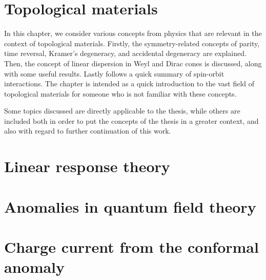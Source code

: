 \documentclass[
draft,
fontsize=11pt,
paper=B5,
BCOR=5mm,
]{scrbook}
\begin{document}
% 
\frontmatter
{}


\tableofcontents

\mainmatter
{}


\chapter{Topological materials}
In this chapter, we consider various concepts from physics that are relevant in the context of topological materials.
Firstly, the symmetry-related concepts of parity, time reversal, Kramer's degeneracy, and accidental degeneracy are explained.
Then, the concept of linear dispersion in Weyl and Dirac cones is discussed, along with some useful results.
Lastly follows a quick summary of spin-orbit interactions.
The chapter is intended as a quick introduction to the vast field of topological materials for someone who is not familiar with these concepts.

Some topics discussed are directly applicable to the thesis, while others are included both in order to put the concepts of the thesis in a greater context, and also with regard to further continuation of this work.









\chapter{Linear response theory}


\chapter{Anomalies in quantum field theory}


\chapter{Charge current from the conformal anomaly}\label{ch:charge-current}





\end{document}
